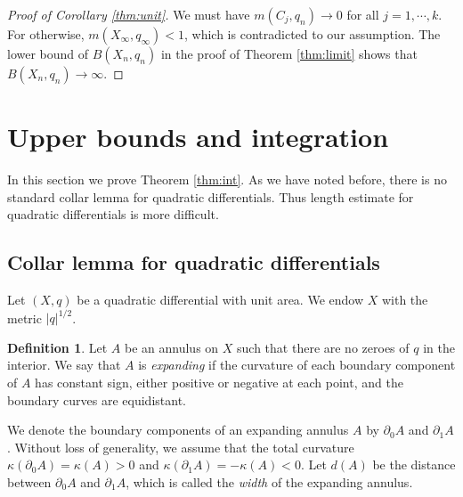\documentclass{amsart}
\theoremstyle{plain}
\theoremstyle{definition}
\newtheorem{definition}{Definition}
\numberwithin{equation}{section}
\begin{document}
\begin{proof}[Proof of Corollary \ref{thm:unit}]
We must have $m(C_j, q_n) \to 0$ for all $j=1, \cdots, k$. 
For otherwise,  $m(X_\infty, q_\infty)<1$, which is contradicted to our assumption. 
The lower bound of $B(X_n,q_n)$ in the proof of Theorem \ref{thm:limit} shows that 
$B(X_n,q_n) \to \infty$.
  
\end{proof}



























\section{Upper bounds and integration}
\label{sec:collar}
In this section we prove Theorem \ref{thm:int}. 
As we have noted before,
there is no standard collar lemma for quadratic differentials. 
Thus length estimate for quadratic differentials is more difficult. 

\subsection{Collar lemma for quadratic differentials}




Let $(X,q)$ be a quadratic differential with unit area. 
We endow $X$ with the metric $|q|^{1/2}$. 


\begin{definition}
    Let $A$ be an annulus on $X$ such that there are no zeroes of $q$ in the interior.
   We say that $A$ is \emph{expanding} if the curvature of each boundary component of $A$ has constant sign, either positive or
negative at each point, and the boundary curves are equidistant.
\end{definition}
We denote the boundary components of an expanding annulus $A$ by $\partial_0 A$ and $\partial_1 A$. Without loss of generality, we  assume that the total curvature $\kappa(\partial_0 A)= \kappa(A)> 0$ and $\kappa(\partial_1 A)= -\kappa(A) < 0$. 
Let $d(A)$ be the distance between $\partial_0 A$ and $\partial_1 A$,
which is called the \emph{width} of the expanding annulus.
\end{document}
